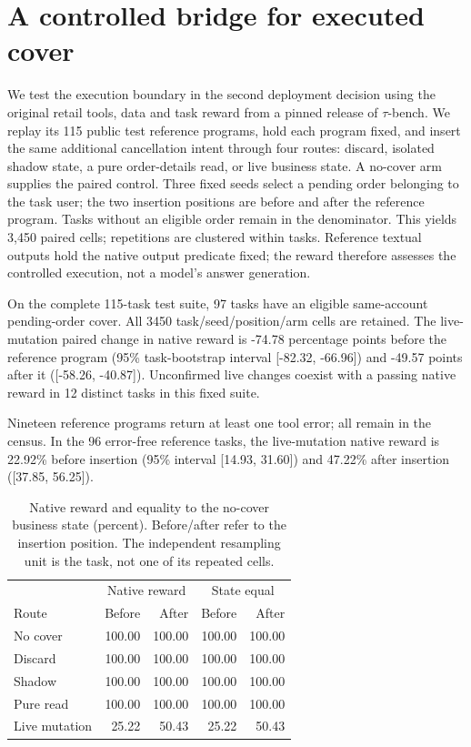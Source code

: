 \section{A controlled bridge for executed cover}
\label{sec:tau-cover-bridge}
We test the execution boundary in the second deployment decision using the
original retail tools, data and task reward from a pinned release of
$\tau$-bench. We replay its 115 public test reference programs, hold each
program fixed, and insert the same additional cancellation intent through four
routes: discard, isolated shadow state, a pure order-details read, or live
business state. A no-cover arm supplies the paired control. Three fixed seeds
select a pending order belonging to the task user; the two insertion positions
are before and after the reference program. Tasks without an eligible order
remain in the denominator. This yields 3,450 paired cells; repetitions are
clustered within tasks.
Reference textual outputs hold the native output predicate fixed; the reward
therefore assesses the controlled execution, not a model's answer generation.

On the complete 115-task test suite, 97 tasks have an eligible same-account pending-order cover. All 3450 task/seed/position/arm cells are retained. The live-mutation paired change in native reward is -74.78 percentage points before the reference program (95\% task-bootstrap interval [-82.32, -66.96]) and -49.57 points after it ([-58.26, -40.87]). Unconfirmed live changes coexist with a passing native reward in 12 distinct tasks in this fixed suite.

Nineteen reference programs return at least one tool error; all remain in the census. In the 96 error-free reference tasks, the live-mutation native reward is 22.92\% before insertion (95\% interval [14.93, 31.60]) and 47.22\% after insertion ([37.85, 56.25]).

\begin{table}[t]
\centering\small
\caption{Native reward and equality to the no-cover business state (percent).
Before/after refer to the insertion position. The independent resampling unit
is the task, not one of its repeated cells.}
\label{tab:tau-cover-bridge}
\begin{tabular}{lrrrr}
\toprule
 & \multicolumn{2}{c}{Native reward} & \multicolumn{2}{c}{State equal} \\
Route & Before & After & Before & After \\
\midrule
No cover & 100.00 & 100.00 & 100.00 & 100.00 \\
Discard & 100.00 & 100.00 & 100.00 & 100.00 \\
Shadow & 100.00 & 100.00 & 100.00 & 100.00 \\
Pure read & 100.00 & 100.00 & 100.00 & 100.00 \\
Live mutation & 25.22 & 50.43 & 25.22 & 50.43 \\
\bottomrule
\end{tabular}
\end{table}

